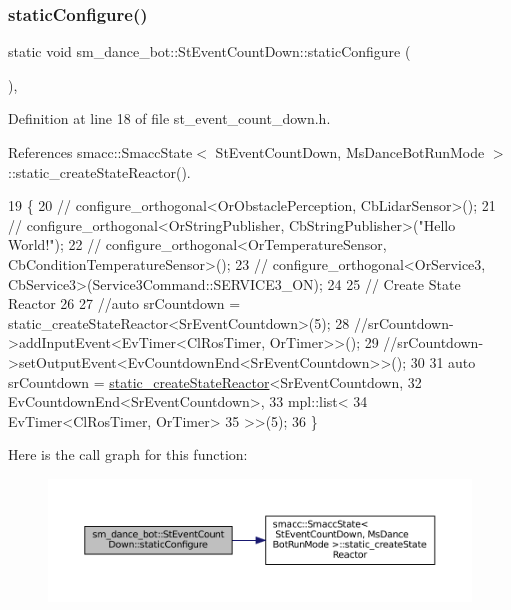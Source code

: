 \subsubsection{\texorpdfstring{static\+Configure()}{staticConfigure()}}
{\footnotesize\ttfamily static void sm\+\_\+dance\+\_\+bot\+::\+St\+Event\+Count\+Down\+::static\+Configure (\begin{DoxyParamCaption}{ }\end{DoxyParamCaption})\hspace{0.3cm}{\ttfamily [inline]}, {\ttfamily [static]}}



Definition at line 18 of file st\+\_\+event\+\_\+count\+\_\+down.\+h.



References smacc\+::\+Smacc\+State$<$ St\+Event\+Count\+Down, Ms\+Dance\+Bot\+Run\+Mode $>$\+::static\+\_\+create\+State\+Reactor().


\begin{DoxyCode}
19     \{
20         \textcolor{comment}{//   configure\_orthogonal<OrObstaclePerception, CbLidarSensor>();}
21         \textcolor{comment}{//   configure\_orthogonal<OrStringPublisher, CbStringPublisher>("Hello World!");}
22         \textcolor{comment}{//   configure\_orthogonal<OrTemperatureSensor, CbConditionTemperatureSensor>();}
23         \textcolor{comment}{//   configure\_orthogonal<OrService3, CbService3>(Service3Command::SERVICE3\_ON);      }
24         
25         \textcolor{comment}{// Create State Reactor}
26         
27         \textcolor{comment}{//auto srCountdown = static\_createStateReactor<SrEventCountdown>(5);        }
28         \textcolor{comment}{//srCountdown->addInputEvent<EvTimer<ClRosTimer, OrTimer>>();}
29         \textcolor{comment}{//srCountdown->setOutputEvent<EvCountdownEnd<SrEventCountdown>>();}
30 
31         \textcolor{keyword}{auto} srCountdown = \hyperlink{classsmacc_1_1SmaccState_a892be704b48f93bf5c35635d1a58ed54}{static\_createStateReactor}<SrEventCountdown, 
32                                                          EvCountdownEnd<SrEventCountdown>, 
33                                                          mpl::list<
34                                                                   EvTimer<ClRosTimer, OrTimer>
35                                                                   >>(5);
36     \}
\end{DoxyCode}
Here is the call graph for this function\+:
\nopagebreak
\begin{figure}[H]
\begin{center}
\leavevmode
\includegraphics[width=350pt]{structsm__dance__bot_1_1StEventCountDown_a6095670c25c304d3839ee3a1a24ec193_cgraph}
\end{center}
\end{figure}


